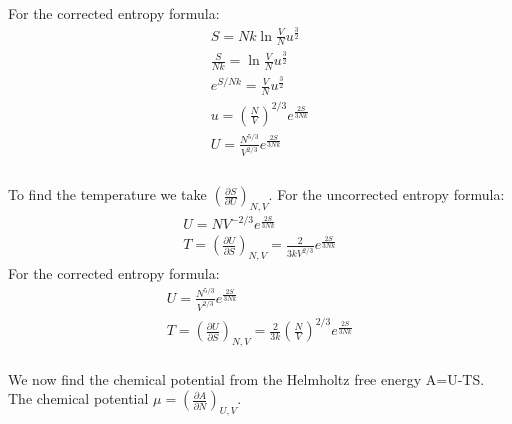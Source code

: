 \documentclass[a4paper,10pt]{article}
\numberwithin{equation}{section}
\begin{document}
For the corrected entropy formula:
\begin{gather}
 S=Nk\ln{\frac{V}{N}u^{\frac{3}{2}}}\\
 \frac{S}{Nk}=\ln{\frac{V}{N}u^{\frac{3}{2}}}\\
 e^{S/Nk}=\frac{V}{N}u^{\frac{3}{2}}\\
 u=(\frac{N}{V})^{2/3}e^{\frac{2S}{3Nk}}\\
 U=\frac{N^{5/3}}{V^{2/3}}e^{\frac{2S}{3Nk}}\\
\end{gather}
\\
To find the temperature we take $\left(\frac{\partial S}{\partial U}\right)_{N,V}$.
For the uncorrected entropy formula:
\begin{gather}
 U=NV^{-2/3}e^{\frac{2S}{3Nk}}\\
 T=\left(\frac{\partial U}{\partial S}\right)_{N,V}=
    \frac{2}{3kV^{2/3}}e^{\frac{2S}{3Nk}}
\end{gather}
For the corrected entropy formula:
\begin{gather}
 U=\frac{N^{5/3}}{V^{2/3}}e^{\frac{2S}{3Nk}}\\
 T=\left(\frac{\partial U}{\partial S}\right)_{N,V}=
  \frac{2}{3k}\left(\frac{N}{V}\right)^{2/3}  e^{\frac{2S}{3Nk}}
\end{gather}
\\
We now find the chemical potential from the Helmholtz free energy A=U-TS.
The chemical potential $\mu=(\frac{\partial A}{\partial N})_{U,V}$.
\end{document}

